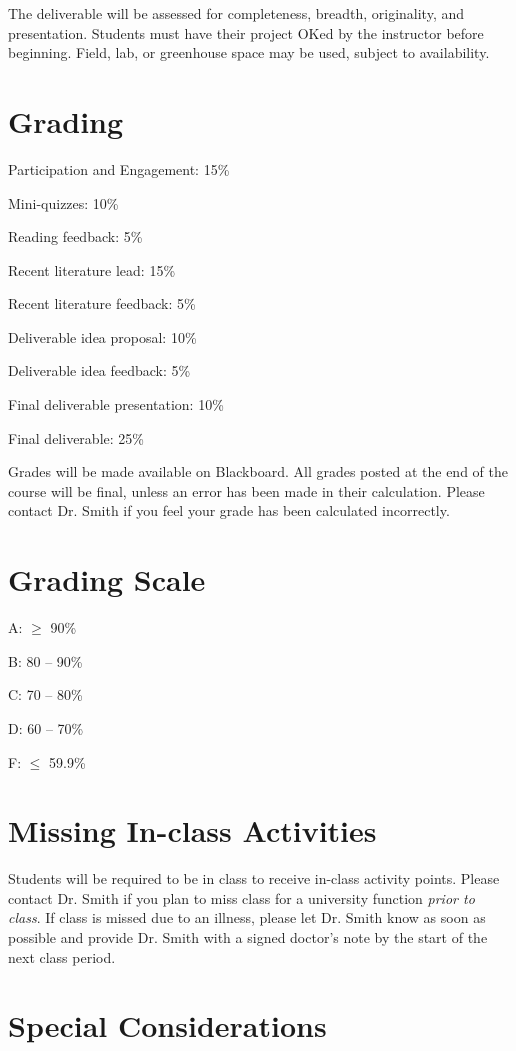 \documentclass[12pt, notitlepage]{article}   	%
\begin{document}
{The deliverable will be assessed for completeness, breadth, originality, and presentation.
Students must have their project OKed by the instructor before beginning. Field, lab,
or greenhouse space may be used, subject to availability.

\section{Grading}
Participation and Engagement: 15\% \par
Mini-quizzes: 10\% \par
Reading feedback: 5\% \par
Recent literature lead: 15\% \par
Recent literature feedback: 5\% \par
Deliverable idea proposal: 10\% \par
Deliverable idea feedback: 5\% \par
Final deliverable presentation: 10\% \par
Final deliverable: 25\% \par

Grades will be made available on Blackboard. 
All grades posted at the end of the course will be final, 
unless an error has been made in their calculation.
Please contact Dr. Smith if you feel your grade has been calculated incorrectly.

\section{Grading Scale}
A: $\geq$ 90\% \par
B: 80 – 90\% \par
C: 70 – 80\% \par
D: 60 – 70\% \par
F: $\leq$ 59.9\% \par

\section{Missing In-class Activities}
Students will be required to be in class to receive in-class activity points. 
Please contact Dr. Smith if you plan to miss class for a university function 
\textit{prior to class}. If class is missed due to an illness, 
please let Dr. Smith know as soon as possible and provide Dr. Smith with 
a signed doctor’s note by the start of the next class period.

\section{Special Considerations}
}
\end{document}
